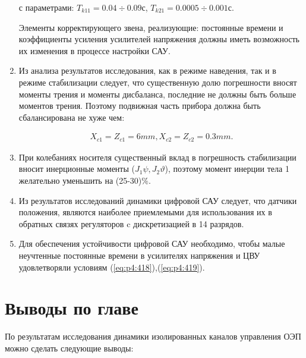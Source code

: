 \begin{enumerate}
	с параметрами:  $T_{k11}=0.04 \div 0.09$с, $T_{k21}=0.0005 \div 0.001$с.
	
	Элементы корректирующего звена, реализующие: постоянные времени и коэффициенты   усиления усилителей напряжения должны иметь возможность их изменения в процессе настройки САУ.
	\item Из анализа результатов исследования, как в режиме наведения, так и в режиме стабилизации следует, что существенную долю погрешности вносят моменты трения и моменты дисбаланса, последние не должны быть больше моментов трения. Поэтому подвижная часть прибора должна быть сбалансирована не хуже чем:
	
	\begin{equation}
	\label{eq:p4:-5}
	\begin{alignedat}{2}
	X_{c1}=Z_{c1}=6 mm, X_{c2}=Z_{c2}= 0.3 mm.
	\end{alignedat}
	\end{equation}

	\item При колебаниях носителя существенный вклад в погрешность стабилизации вносит инерционные моменты (\( J_{1} \psi, J_{2}\vartheta \)), поэтому момент инерции тела 1 желательно уменьшить на (25-30)$\%$.
	\item Из результатов исследований динамики цифровой САУ следует, что датчики положения, являются наиболее приемлемыми для использования их в обратных связях регуляторов c дискретизацией в 14 разрядов.
	\item Для обеспечения устойчивости цифровой САУ необходимо, чтобы малые неучтенные постоянные времени в усилителях напряжения и ЦВУ удовлетворяли условиям (\ref{eq:p4:418}),(\ref{eq:p4:419}).
\end{enumerate}





\section{Выводы по главе} \label{ch:ch4/sect8}

По результатам исследования динамики изолированных каналов управления ОЭП можно сделать следующие выводы:

